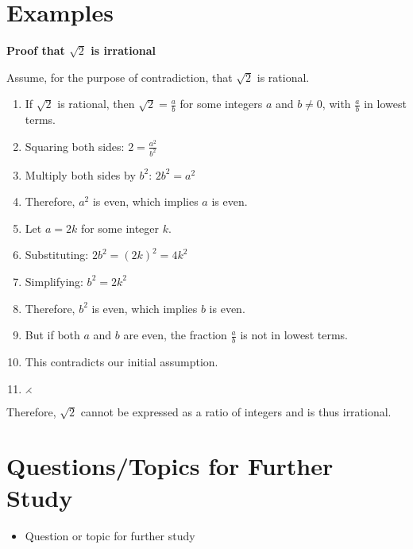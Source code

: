 \documentclass[12pt,a4paper]{article}
\begin{document}
\section{Examples}
\begin{tcolorbox}
\textbf{Proof that $\sqrt{2}$ is irrational}

Assume, for the purpose of contradiction, that $\sqrt{2}$ is rational.

\begin{enumerate}
    \item If $\sqrt{2}$ is rational, then $\sqrt{2} = \frac{a}{b}$ for some integers $a$ and $b \neq 0$, with $\frac{a}{b}$ in lowest terms.
    \item Squaring both sides: $2 = \frac{a^2}{b^2}$
    \item Multiply both sides by $b^2$: $2b^2 = a^2$
    \item Therefore, $a^2$ is even, which implies $a$ is even.
    \item Let $a = 2k$ for some integer $k$.
    \item Substituting: $2b^2 = (2k)^2 = 4k^2$
    \item Simplifying: $b^2 = 2k^2$
    \item Therefore, $b^2$ is even, which implies $b$ is even.
    \item But if both $a$ and $b$ are even, the fraction $\frac{a}{b}$ is not in lowest terms.
    \item This contradicts our initial assumption.
    \item \( \rightthreetimes \)
\end{enumerate}

Therefore, $\sqrt{2}$ cannot be expressed as a ratio of integers and is thus irrational.
\end{tcolorbox}

\section{Questions/Topics for Further Study}
\begin{itemize}
  \item Question or topic for further study
\end{itemize}
\end{document}
